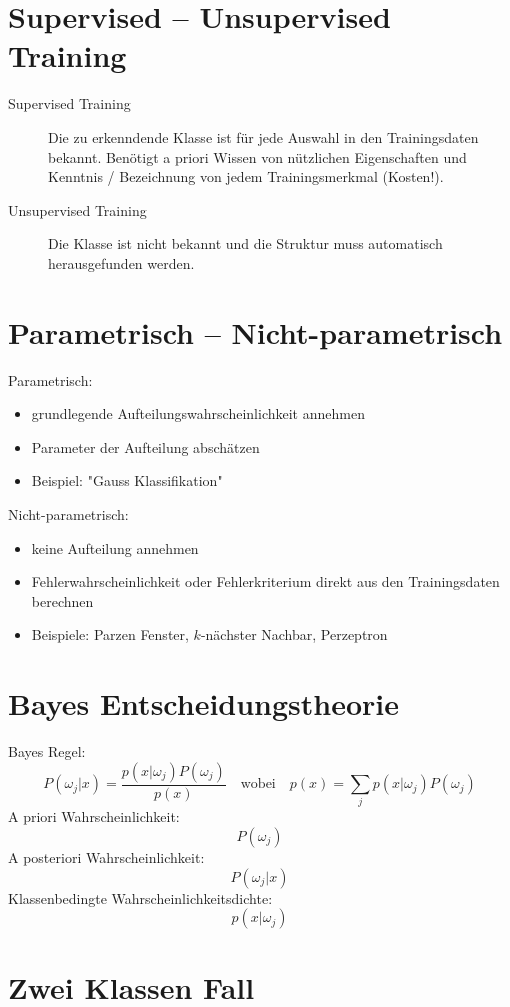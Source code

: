 \section{Supervised -- Unsupervised Training}

\begin{description}
\item[Supervised Training] Die zu erkenndende Klasse ist für jede Auswahl in den Trainingsdaten bekannt. Benötigt a priori Wissen von nützlichen Eigenschaften und Kenntnis / Bezeichnung von jedem Trainingsmerkmal (Kosten!).
\item[Unsupervised Training] Die Klasse ist nicht bekannt und die Struktur muss automatisch herausgefunden werden.
\end{description}

\section{Parametrisch -- Nicht-parametrisch}

Parametrisch:
\begin{itemize}
\item grundlegende Aufteilungswahrscheinlichkeit annehmen
\item Parameter der Aufteilung abschätzen
\item Beispiel: "{}Gauss Klassifikation"{}
\end{itemize}
Nicht-parametrisch:
\begin{itemize}
\item keine Aufteilung annehmen
\item Fehlerwahrscheinlichkeit oder Fehlerkriterium direkt aus den Trainingsdaten berechnen
\item Beispiele: Parzen Fenster, $k$-nächster Nachbar, Perzeptron
\end{itemize}


\section{Bayes Entscheidungstheorie}

Bayes Regel: $$P(\omega_j | x) = \frac{p(x | \omega_j) P(\omega_j)}{p(x)} \quad \textrm{wobei} \quad p(x) = \sum\limits_{j} p(x | \omega_j) P(\omega_j)$$
A priori Wahrscheinlichkeit: $$P(\omega_j)$$
A posteriori Wahrscheinlichkeit: $$P(\omega_j | x)$$
Klassenbedingte Wahrscheinlichkeitsdichte: $$p(x | \omega_j)$$

\section{Zwei Klassen Fall}

